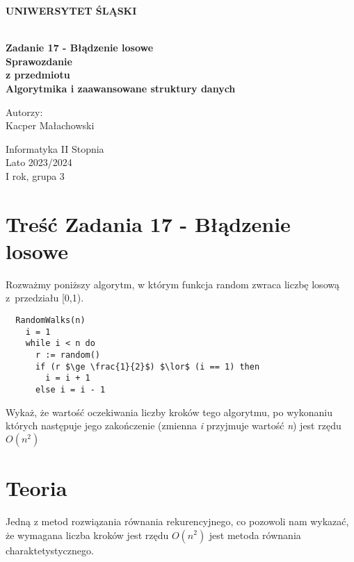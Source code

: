 \documentclass[12pt,oneside,a4paper]{book} %
\theoremstyle{break}
\begin{document}
\thispagestyle{empty}
\begin{center}
  \Large
  \bf{UNIWERSYTET ŚLĄSKI}\\
  \bf{}\\[25mm]
  \large

  \bf{Zadanie 17 - Błądzenie losowe}\\[35mm]

  Sprawozdanie\\
  z przedmiotu\\
  Algorytmika i zaawansowane struktury danych\\[25mm]
\end{center}
\begin{flushright}
  \large
  Autorzy:\\
  Kacper Małachowski\\
\end{flushright}
\vspace*{\fill}
\begin{center}
  Informatyka II Stopnia\\
  Lato 2023/2024\\
  I rok, grupa 3\\[25mm]
\end{center}

\chapter*{Treść Zadania 17 - Błądzenie losowe}

Rozważmy poniższy algorytm, w którym funkcja random zwraca liczbę losową z~przedziału [0,1).
\begin{lstlisting}
  RandomWalks(n)
    i = 1
    while i < n do
      r := random()
      if (r $\ge \frac{1}{2}$) $\lor$ (i == 1) then
        i = i + 1
      else i = i - 1
\end{lstlisting}

Wykaż, że wartość oczekiwania liczby kroków tego algorytmu, po wykonaniu których następuje jego zakończenie (zmienna \textit{i} przyjmuje wartość \textit{n}) jest rzędu \textit{$O(n^2)$}

\chapter*{Teoria}

Jedną z metod rozwiązania równania rekurencyjnego, co pozowoli nam wykazać, że wymagana liczba kroków jest rzędu $O(n^2)$ jest metoda równania charaktetystycznego.
\end{document}
